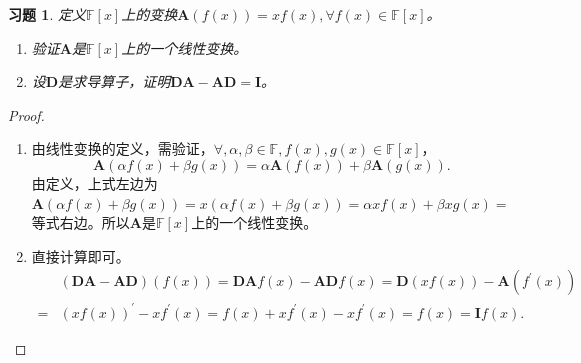 \documentclass[UTF8]{ctexart}
\newtheorem{ex}[thm]{习题}
\begin{document}
\begin{ex}
定义$\mathbb{F}[x]$上的变换$\mathbf{A}(f(x)) = xf(x), \forall f(x) \in \mathbb{F}[x]$。
\begin{enumerate}
\item
验证$\mathbf{A}$是$\mathbb{F}[x]$上的一个线性变换。
\item
设$\mathbf{D}$是求导算子，证明$\mathbf{D}\mathbf{A} - \mathbf{A}\mathbf{D} = \mathbf{I}$。
\end{enumerate}
\end{ex}
\begin{proof}
\begin{enumerate}
\item
由线性变换的定义，需验证，$\forall, \alpha, \beta \in \mathbb{F}, f(x), g(x) \in \mathbb{F}[x]$，
\[
\mathbf{A}(\alpha f(x)+\beta g(x)) = \alpha \mathbf{A}(f(x))  + \beta \mathbf{A}(g(x)). 
\]
由定义，上式左边为$\mathbf{A}(\alpha f(x)+\beta g(x)) = x(\alpha f(x)+\beta g(x)) = \alpha xf(x) + \beta xg(x) =$ 等式右边。所以$\mathbf{A}$是$\mathbb{F}[x]$上的一个线性变换。
\item
直接计算即可。
\begin{equation} \nonumber
\begin{split}
&(\mathbf{D}\mathbf{A} - \mathbf{A}\mathbf{D} )(f(x)) = \mathbf{D}\mathbf{A} f(x)- \mathbf{A}\mathbf{D} f(x) 
=  \mathbf{D}(xf(x)) - \mathbf{A}(f^{'}(x)) \\
=& (xf(x))^{'} - xf^{'}(x) = f(x) + xf^{'}(x) - xf^{'}(x) = f(x) = \mathbf{I} f(x). 
\end{split}
\end{equation}
\end{enumerate}
\end{proof}
\end{document}
